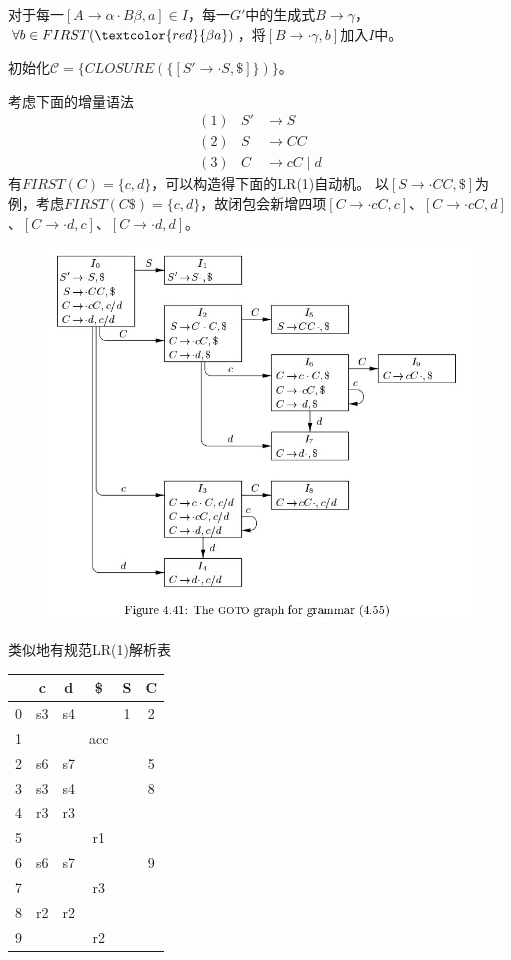 \begin{myalgorithm}[计算$CLOSURE(I)$]
对于每一$[A\to\alpha\cdot B\beta,a]\in I$，每一$G'$中的生成式$B\to\gamma$，$\forall b\in FIRST(\textcolor{red}{\beta a})$，将$[B\to\cdot\gamma,b]$加入$I$中。

初始化$\mathcal{C}=\{CLOSURE(\{[S'\to\cdot S,\$]\})\}$。
\end{myalgorithm}
\begin{example}
\label{example:lr1}
考虑下面的增量语法
\[\begin{array}{rrl}
(1) & S' &\to S\\
(2) & S &\to C C\\
(3) & C &\to c C\mid d
\end{array}\]
有$FIRST(C)=\{c,d\}$，可以构造得下面的LR(1)自动机。
以$[S\to\cdot CC,\$]$为例，考虑$FIRST(C\$)=\{c,d\}$，故闭包会新增四项$[C\to\cdot cC,c]$、$[C\to\cdot cC,d]$、$[C\to\cdot d,c]$、$[C\to\cdot d,d]$。
\begin{figure}[H]
\centering
\includegraphics[width=0.8\linewidth]{fig/LR1-eg.jpg}
\end{figure}
类似地有规范LR(1)解析表
\begin{center}
\begin{tabular}{|c|c|c|c|c|c|}\hline
  & c  & d  & \$  & S & C \\\hline
0 & s3 & s4 &     & 1 & 2 \\\hline
1 &    &    & acc &   &   \\\hline
2 & s6 & s7 &     &   & 5 \\\hline
3 & s3 & s4 &     &   & 8 \\\hline
4 & r3 & r3 &     &   &   \\\hline
5 &    &    & r1  &   &   \\\hline
6 & s6 & s7 &     &   & 9 \\\hline
7 &    &    & r3  &   &   \\\hline
8 & r2 & r2 &     &   &   \\\hline
9 &    &    & r2  &   &   \\\hline
\end{tabular}
\end{center}
\end{example}

